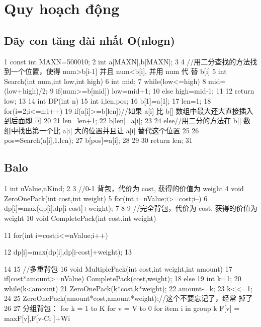\documentclass[11pt]{article}
\begin{document}
\section{Quy hoạch động}

\subsection{Dãy con tăng dài nhất O(nlogn)}

\begin{Code}
 1 const int MAXN=500010;
 2 int a[MAXN],b[MAXN];
 3
 4 //用二分查找的方法找到一个位置，使得 num>b[i-1] 并且 num<b[i], 并用 num 代
      替 b[i]
 5 int Search(int num,int low,int high){
 6     int mid;
 7     while(low<=high){
 8         mid=(low+high)/2;
 9         if(num>=b[mid]) low=mid+1;
10         else    high=mid-1;
11     }
12     return low;
13 }
14 int DP(int n){
15     int i,len,pos;
16     b[1]=a[1];
17     len=1;
18     for(i=2;i<=n;i++){
19         if(a[i]>=b[len])//如果 a[i] 比 b[] 数组中最大还大直接插入到后面即
              可
20         {
21              len=len+1;
22              b[len]=a[i];
23         }
24         else//用二分的方法在 b[] 数组中找出第一个比 a[i] 大的位置并且让
              a[i] 替代这个位置
25         {
26              pos=Search(a[i],1,len);
27              b[pos]=a[i];
28         }
29     }
30     return len;
31 }
\end{Code}

\subsection{Balo}

\begin{Code}
 1   int nValue,nKind;
 2
 3   //0-1 背包，代价为 cost, 获得的价值为 weight
 4   void ZeroOnePack(int cost,int weight){
 5       for(int i=nValue;i>=cost;i--)
 6         dp[i]=max(dp[i],dp[i-cost]+weight);
 7   }
 8
 9   //完全背包，代价为 cost, 获得的价值为 weight
10   void CompletePack(int cost,int weight){
11       for(int i=cost;i<=nValue;i++)


12       dp[i]=max(dp[i],dp[i-cost]+weight);
13 }
14
15 //多重背包
16 void MultiplePack(int cost,int weight,int amount){
17     if(cost*amount>=nValue) CompletePack(cost,weight);
18     else{
19         int k=1;
20         while(k<amount){
21             ZeroOnePack(k*cost,k*weight);
22             amount-=k;
23             k<<=1;
24         }
25         ZeroOnePack(amount*cost,amount*weight);//这个不要忘记了，经常
              掉了
26     }
27 }
     分组背包：
     for k = 1 to K
     for v = V to 0
     for item i in group k
     F[v] = maxF[v],F[v-Ci ]+Wi
\end{Code}
\end{document}
